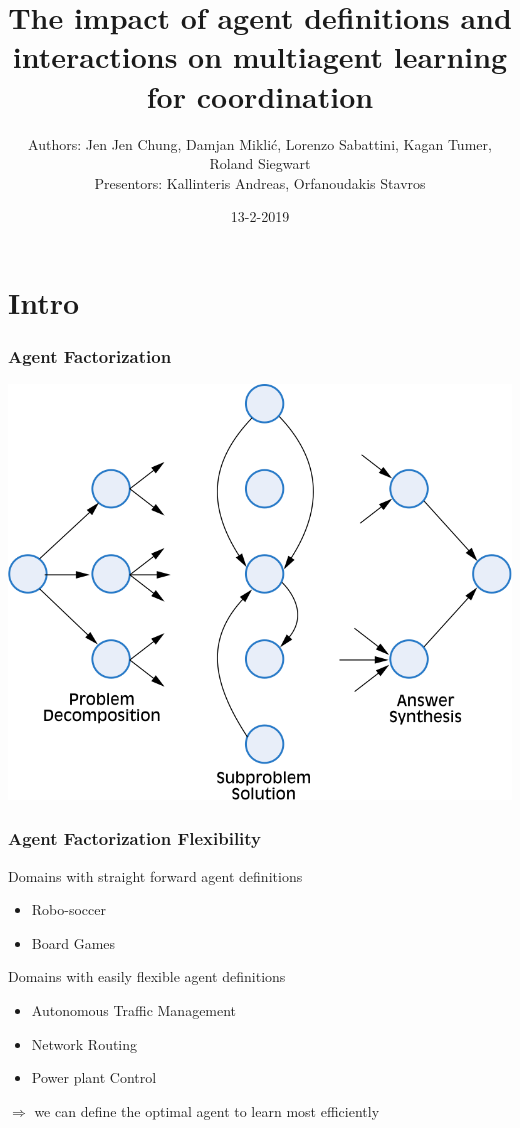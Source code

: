 \documentclass{beamer}
\title{The impact of agent definitions and interactions on multiagent learning for coordination} %
\author{Authors: Jen Jen Chung, Damjan Miklić, Lorenzo Sabattini, Kagan Tumer, Roland Siegwart
\\ Presentors: Kallinteris Andreas, Orfanoudakis Stavros}
\date{13-2-2019} %
\begin{document}
	\begin{frame}
		\maketitle %
	\end{frame}

	\section{Intro}
	\begin{frame}
		\frametitle{Agent Factorization}
		\includegraphics[height=0.9\textheight,width=\textwidth]{agent-factor.png}
	\end{frame}
	\begin{frame}
		\frametitle{Agent Factorization Flexibility}
		Domains with straight forward agent definitions
		\begin{itemize}
			\item Robo-soccer
			\item Board Games
		\end{itemize}
		Domains with easily flexible agent definitions
		\begin{itemize}
			\item Autonomous Traffic Management
			\item Network Routing
			\item Power plant Control
		\end{itemize}
		$\Rightarrow$ we can define the optimal agent to learn most efficiently
	\end{frame}
\end{document}
